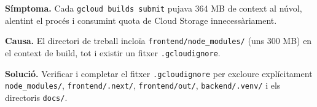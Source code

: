 \textbf{Símptoma.} Cada \texttt{gcloud builds submit} pujava 364 MB de context al núvol, alentint el procés i consumint quota de Cloud Storage innecessàriament.

\textbf{Causa.} El directori de treball incloïa \texttt{frontend/node\_modules/} (uns 300 MB) en el context de build, tot i existir un fitxer \texttt{.gcloudignore}.

\textbf{Solució.} Verificar i completar el fitxer \texttt{.gcloudignore} per excloure explícitament \texttt{node\_modules/}, \texttt{frontend/.next/}, \texttt{frontend/out/}, \texttt{backend/.venv/} i els directoris \texttt{docs/}.
